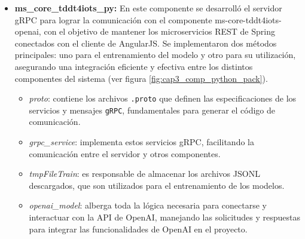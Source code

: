 \begin{itemize}
	Finalmente, la tarea de implementar o usar el modelo ya entrenado se describe en la figura \ref{fig:cap3_diagrama_secuencia_tarea3}, detallando cada paso mediante un diagrama de secuencia. Para cada petición del cliente, se verifica el token de sesión para controlar quién tiene acceso a estas funcionalidades. El token se mantiene desde el componente existente en la herramienta, realizando una petición a dicho componente para no afectar la funcionalidad actual. Una vez validados los permisos, el servidor realiza una petición a la API de OpenAI para obtener la respuesta esperada.
	
	
	\begin{figure}[H]  
		\centering
		\texttt{[image: cap3\_diagrama\_secuencia\_tarea3.png]}
		\caption{Diagrama de secuencia para explicar a detalle el proceso de usar  el modelo.}
		\label{fig:cap3_diagrama_secuencia_tarea3}
	\end{figure}
	
	\item \textbf{ms\_core\_tddt4iots\_py: } En este componente se desarrolló el servidor gRPC para lograr la comunicación con el componente ms-core-tddt4iots-openai, con el objetivo de mantener los microservicios REST de Spring conectados con el cliente de AngularJS. Se implementaron dos métodos principales: uno para el entrenamiento del modelo y otro para su utilización, asegurando una integración eficiente y efectiva entre los distintos componentes del sistema (ver figura \ref{fig:cap3_comp_python_pack}).
		
	\begin{itemize}
		\item \textit{proto}: contiene los archivos \texttt{.proto} que definen las especificaciones de los servicios y mensajes \texttt{gRPC}, fundamentales para generar el código de comunicación.
		\item \textit{grpc\_service}: implementa estos servicios gRPC, facilitando la comunicación entre el servidor y otros componentes.
		\item \textit{tmpFileTrain}: es responsable de almacenar los archivos JSONL descargados, que son utilizados para el entrenamiento de los modelos.
		\item \textit{openai\_model}: alberga toda la lógica necesaria para conectarse y interactuar con la API de OpenAI, manejando las solicitudes y respuestas para integrar las funcionalidades de OpenAI en el proyecto.
	\end{itemize}
	

\end{itemize}
